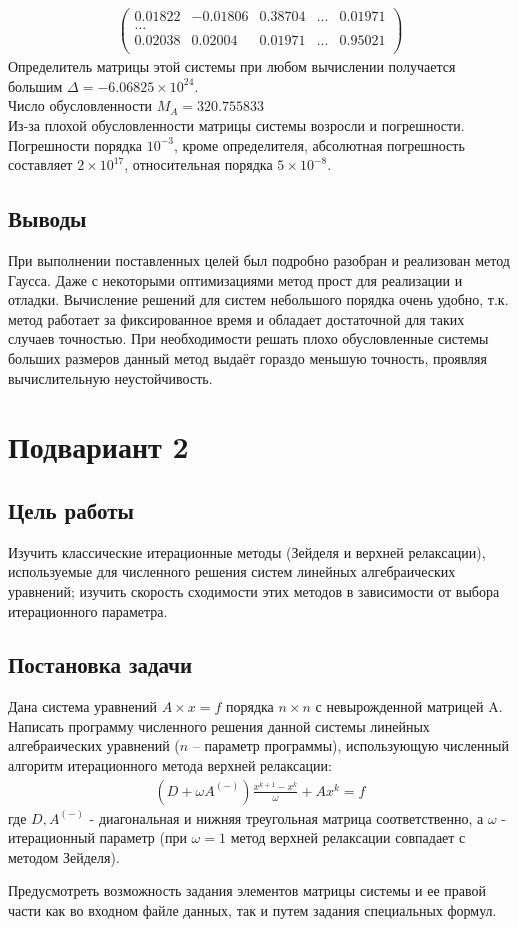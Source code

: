 \documentclass[a4paper,12pt,titlepage,finall]{article}
\begin{document}
\begin{enumerate}
\begin{align*}
\begin{pmatrix}
	0.01822&    -0.01806&     0.38704& ... &     0.01971 \\
	...\\
	0.02038&     0.02004&     0.01971& ... &     0.95021 \\
\end{pmatrix}
\end{align*}
Определитель матрицы этой системы при любом вычислении получается большим $\Delta = -6.06825 \times 10^{24}$.\\
Число обусловленности $M_A = 320.755833$\\
Из-за плохой обусловленности матрицы системы возросли и погрешности. Погрешности порядка $10^{-3}$, кроме определителя, абсолютная погрешность составляет $2 \times 10^{17}$, относительная порядка $5 \times 10^{-8}$.
\end{enumerate}
\subsection{Выводы}
При выполнении поставленных целей был подробно разобран и реализован метод Гаусса. Даже с некоторыми оптимизациями метод прост для реализации и отладки. Вычисление решений для систем небольшого порядка очень удобно, т.к. метод работает за фиксированное время и обладает достаточной для таких случаев точностью. При необходимости решать плохо обусловленные системы больших размеров данный метод выдаёт гораздо меньшую точность, проявляя вычислительную неустойчивость.

\newpage
\section{Подвариант 2}
\subsection{Цель работы}
Изучить классические итерационные методы (Зейделя и верхней релаксации),
используемые для численного решения систем линейных алгебраических уравнений;
изучить скорость сходимости этих методов в зависимости от выбора итерационного
параметра.
\subsection{Постановка задачи}
Дана система уравнений $A \times x=f$ порядка $n \times n$ с невырожденной матрицей A. Написать
программу численного решения данной системы линейных алгебраических уравнений
($n$ – параметр программы), использующую численный алгоритм итерационного метода
верхней релаксации:
\begin{align*}
(D + \omega A^{(-)})\frac{x^{k+1}-x^k}{\omega} + Ax^k = f
\end{align*}
где $D, A^{(-)}$ - диагональная и нижняя треугольная матрица соответственно, а $\omega$ - итерационный параметр (при $\omega = 1$ метод верхней релаксации совпадает с методом Зейделя).
\par
Предусмотреть возможность задания элементов матрицы системы и ее правой части как
во входном файле данных, так и путем задания специальных формул.
\end{document}
